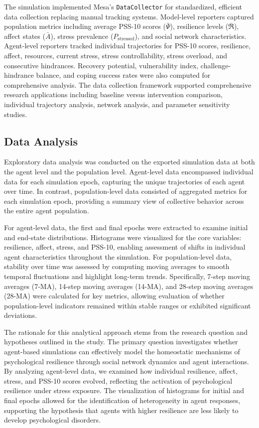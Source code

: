 \documentclass[
  letterpaper,
  DIV=11,
  numbers=noendperiod]{scrartcl}
\begin{document}
The simulation implemented Mesa's \texttt{DataCollector} for
standardized, efficient data collection replacing manual tracking
systems. Model-level reporters captured population metrics including
average PSS-10 scores (\(\bar{\Psi}\)), resilience levels
(\(\bar{\mathfrak{R}}\)), affect states (\(\bar{A}\)), stress prevalence
(\(P_{\text{stressed}}\)), and social network characteristics.
Agent-level reporters tracked individual trajectories for PSS-10 scores,
resilience, affect, resources, current stress, stress controllability,
stress overload, and consecutive hindrances. Recovery potential,
vulnerability index, challenge-hindrance balance, and coping success
rates were also computed for comprehensive analysis. The data collection
framework supported comprehensive research applications including
baseline versus intervention comparison, individual trajectory analysis,
network analysis, and parameter sensitivity studies.

\subsection{Data Analysis}\label{data-analysis}

Exploratory data analysis was conducted on the exported simulation data
at both the agent level and the population level. Agent-level data
encompassed individual data for each simulation epoch, capturing the
unique trajectories of each agent over time. In contrast,
population-level data consisted of aggregated metrics for each
simulation epoch, providing a summary view of collective behavior across
the entire agent population.

For agent-level data, the first and final epochs were extracted to
examine initial and end-state distributions. Histograms were visualized
for the core variables: resilience, affect, stress, and PSS-10, enabling
assessment of shifts in individual agent characteristics throughout the
simulation. For population-level data, stability over time was assessed
by computing moving averages to smooth temporal fluctuations and
highlight long-term trends. Specifically, 7-step moving averages (7-MA),
14-step moving averages (14-MA), and 28-step moving averages (28-MA)
were calculated for key metrics, allowing evaluation of whether
population-level indicators remained within stable ranges or exhibited
significant deviations.

The rationale for this analytical approach stems from the research
question and hypotheses outlined in the study. The primary question
investigates whether agent-based simulations can effectively model the
homeostatic mechanisms of psychological resilience through social
network dynamics and agent interactions. By analyzing agent-level data,
we examined how individual resilience, affect, stress, and PSS-10 scores
evolved, reflecting the activation of psychological resilience under
stress exposure. The visualization of histograms for initial and final
epochs allowed for the identification of heterogeneity in agent
responses, supporting the hypothesis that agents with higher resilience
are less likely to develop psychological disorders.
\end{document}

